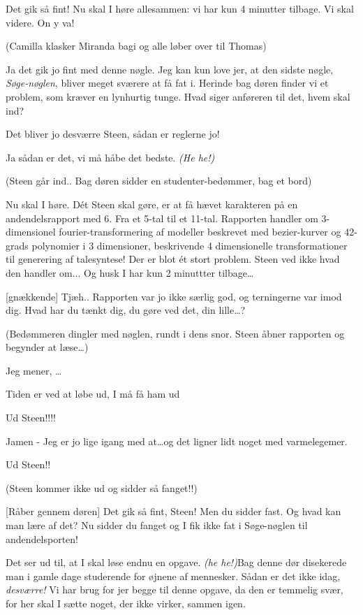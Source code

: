 \documentclass{article}
\begin{document}
\begin{sketch}
 Det gik så fint! Nu skal I høre allesammen: vi har kun 4
minutter tilbage. Vi skal videre. On y va!

\scene (Camilla klasker Miranda bagi og alle løber over til Thomas)

 Ja det gik jo fint med denne nøgle. Jeg kan kun love jer, at
den sidste nøgle, {\em Søge-nøglen\/}, bliver meget sværere at få fat i.
Herinde bag døren finder vi et problem, som kræver en lynhurtig tunge.
Hvad siger anføreren til det, hvem skal ind?

 Det bliver jo desværre Steen, sådan er reglerne jo!

 Ja sådan er det, vi må håbe det bedste. {\em (He he!)}

\scene (Steen går ind.. Bag døren sidder en studenter-bedømmer, bag et bord)

 Nu skal I høre. D\'et Steen skal gøre, er at få hævet
karakteren på en andendelsrapport med 6. Fra et 5-tal til et 11-tal.
Rapporten handler om 3-dimensionel fourier-transformering af modeller
beskrevet med bezier-kurver og 42-grads polynomier i 3 dimensioner,
beskrivende 4 dimensionelle transformationer til generering af talesyntese!
Der er blot \'et stort problem. Steen ved ikke hvad den handler om...
Og husk I har kun 2 minuttter tilbage\ldots

 [gnækkende] Tjæh.. Rapporten var jo ikke særlig god, og
terningerne var imod dig. Hvad har du tænkt dig, du gøre ved det, din
lille\ldots?

\scene (Bedømmeren dingler med nøglen, rundt i dens snor. Steen åbner
rapporten og begynder at læse\ldots)

 Jeg mener, \ldots

 Tiden er ved at løbe ud, I må få ham ud

 Ud Steen!!!!

 Jamen - Jeg er jo lige igang med at\ldots og det ligner lidt noget
med varmelegemer.

 Ud Steen!!

\scene (Steen kommer ikke ud og sidder så fanget!!)

 [Råber gennem døren] Det gik så fint, Steen! Men du sidder
fast. Og hvad kan man lære af det? Nu sidder du fanget og I fik ikke fat i
Søge-nøglen til andendelsporten!

 Det ser ud til, at I skal løse endnu en opgave.
{\em (he he!)\/}Bag denne dør disekerede man i gamle dage studerende for
øjnene af mennesker. Sådan er det ikke idag, {\em desværre!\/} Vi har
brug for jer begge til denne opgave, da den er temmelig svær, for her skal I
sætte noget, der ikke virker, sammen igen.


\end{sketch}
\end{document}
